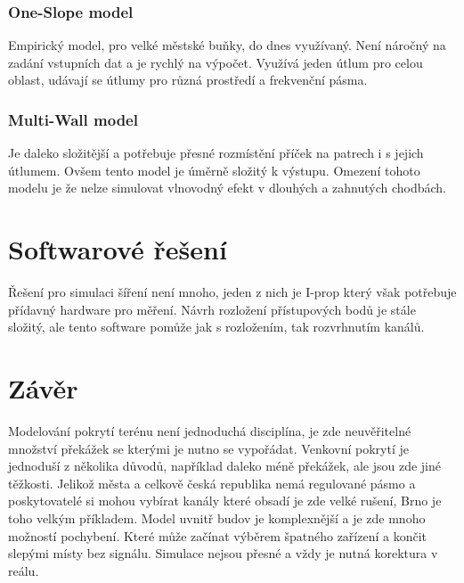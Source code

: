 \documentclass[paper=a4, fontsize=11pt]{scrartcl}
\numberwithin{equation}{section}
\numberwithin{figure}{section}
\numberwithin{table}{section}
\begin{document}
	\subsubsection{One-Slope model}
	Empirický model, 
	pro velké městské buňky, 
	do dnes využívaný. 
	Není náročný na zadání vstupních dat a je rychlý na výpočet. 
	Využívá jeden útlum pro celou oblast, 
	udávají se útlumy pro různá prostředí a frekvenční pásma.
	\subsubsection{Multi-Wall model}
	Je daleko složitější a potřebuje přesné rozmístění příček na patrech i s jejich útlumem. 
	Ovšem tento model je úměrně složitý k výstupu. 
	Omezení tohoto modelu je že nelze simulovat vlnovodný efekt v dlouhých a zahnutých chodbách.
\newpage

\section{Softwarové řešení}
Řešení pro simulaci šíření není mnoho, 
jeden z nich je I-prop který však potřebuje přídavný hardware pro měření. 
Návrh rozložení přístupových bodů je stále složitý, 
ale tento software pomůže jak s rozložením, 
tak rozvrhnutím kanálů.

\section{Závěr}
Modelování pokrytí terénu není jednoduchá disciplína, 
je zde neuvěřitelné množství překážek se kterými je nutno se vypořádat. 
Venkovní pokrytí je jednoduší z několika důvodů, 
například daleko méně překážek, 
ale jsou zde jiné těžkosti. 
Jelikož města a celkově česká republika nemá regulované pásmo 
a poskytovatelé si mohou vybírat kanály které obsadí je zde velké rušení, 
Brno je toho velkým příkladem. 
Model uvnitř budov je komplexnější a je zde mnoho možností pochybení. 
Které může začínat výběrem špatného zařízení a končit slepými místy bez signálu. 
Simulace nejsou přesné a vždy je nutná korektura v reálu.
\end{document}
